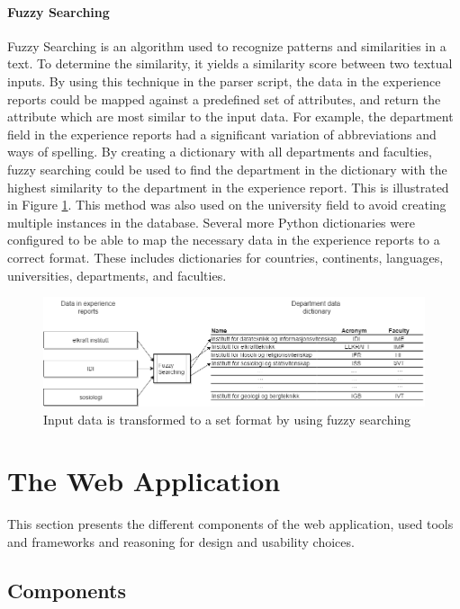 \paragraph{Fuzzy Searching}

Fuzzy Searching is an algorithm used to recognize patterns and similarities in a text. To determine the similarity, it yields a similarity score between two textual inputs. By using this technique in the parser script, the data in the experience reports could be mapped against a predefined set of attributes, and return the attribute which are most similar to the input data. For example, the department field in the experience reports had a significant variation of abbreviations and ways of spelling. By creating a dictionary with all departments and faculties, fuzzy searching could be used to find the department in the dictionary with the highest similarity to the department in the experience report. This is illustrated in Figure \ref{fig:fuzzy_searching}. This method was also used on the university field to avoid creating multiple instances in the database. Several more Python dictionaries were configured to be able to map the necessary data in the experience reports to a correct format. These includes dictionaries for countries, continents, languages, universities, departments, and faculties.

\begin{figure}[h]
    \centering
    \includegraphics[width=1.0\textwidth]{fig/fuzzy_search.png}
    \caption{Input data is transformed to a set format by using fuzzy searching}
    \label{fig:fuzzy_searching}
\end{figure}

\section{The Web Application}

This section presents the different components of the web application, used tools and frameworks and reasoning for design and usability choices.

\subsection{Components}

